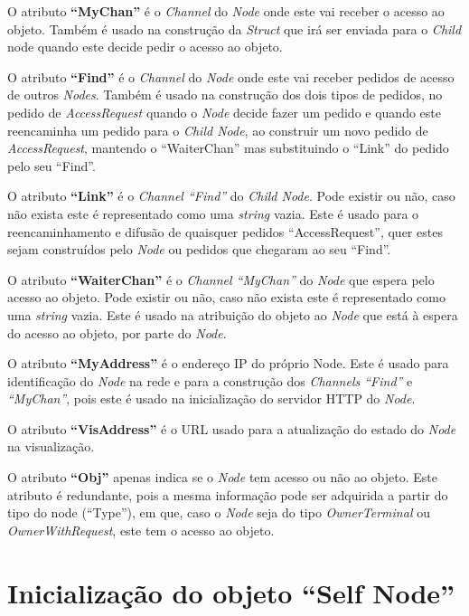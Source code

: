 O atributo \textbf{``MyChan''} é o \emph{Channel} do \emph{Node} onde este vai receber o acesso ao objeto.
Também é usado na construção da \emph{Struct} que irá ser enviada para o \emph{Child} node quando este decide pedir o acesso ao objeto.

O atributo \textbf{``Find''} é o \emph{Channel} do \emph{Node} onde este vai receber pedidos de acesso de outros \emph{Nodes}. 
Também é usado na construção dos dois tipos de pedidos, no pedido de \emph{AccessRequest} quando o \emph{Node} decide fazer um pedido e quando este reencaminha um pedido para o \emph{Child Node}, ao construir um novo pedido de \emph{AccessRequest}, mantendo o ``WaiterChan'' mas substituindo o ``Link'' do pedido pelo seu ``Find''.

O atributo \textbf{``Link''} é o \emph{Channel ``Find''} do \emph{Child Node}. Pode existir ou não, caso não exista este é representado como uma \emph{string} vazia.
Este é usado para o reencaminhamento e difusão de quaisquer pedidos ``AccessRequest'', quer estes sejam construídos pelo \emph{Node} ou pedidos que chegaram ao seu ``Find''.

O atributo \textbf{``WaiterChan''} é o \emph{Channel ``MyChan''} do \emph{Node} que espera pelo acesso ao objeto. Pode existir ou não, caso não exista este é representado como uma \emph{string} vazia.
Este é usado na atribuição do objeto ao \emph{Node} que está à espera do acesso ao objeto, por parte do \emph{Node}.

O atributo \textbf{``MyAddress''} é o endereço \acs{IP} do próprio Node. 
Este é usado para identificação do \emph{Node} na rede e para a construção dos \emph{Channels ``Find''} e \emph{``MyChan''},
pois este é usado na inicialização do servidor \acs{HTTP} do \emph{Node}.

O atributo \textbf{``VisAddress''} é o \acs{URL} usado para a atualização do estado do \emph{Node} na visualização.

O atributo \textbf{``Obj''} apenas indica se o \emph{Node} tem acesso ou não ao objeto.
Este atributo é redundante, pois a mesma informação pode ser adquirida a partir do tipo do node (``Type''), 
em que, caso o \emph{Node} seja do tipo \emph{OwnerTerminal} ou \emph{OwnerWithRequest}, este tem o acesso ao objeto.


\section{Inicialização do objeto ``Self Node''}

